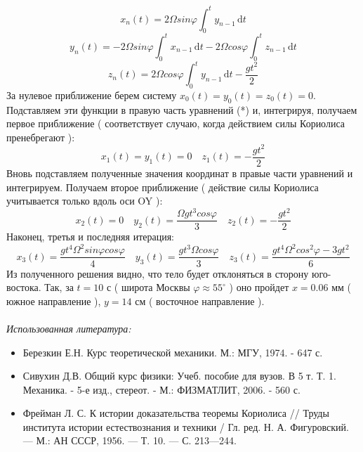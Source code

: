 \documentclass[a4paper, 12pt]{article}
\begin{document}
\[ x_{n}(t) = 2\Omega sin\varphi \int_0^t y_{n-1}\,\mathrm{d}t \]
\[ y_{n}(t) = -2\Omega sin\varphi \int_0^t x_{n-1}\,\mathrm{d}t -2\Omega cos\varphi \int_0^t z_{n-1}\,\mathrm{d}t \]
\[ z_{n}(t) = 2\Omega cos\varphi \int_0^t y_{n-1}\,\mathrm{d}t - \frac{g t^2}{2} \]
За нулевое приближение берем систему $x_0(t) = y_0(t) = z_0(t) = 0$. Подставляем эти функции в правую часть уравнений (*) и, интегрируя, получаем первое приближение ( соответствует случаю, когда действием силы Кориолиса пренебрегают ):
\[ x_1(t) = y_1(t) = 0 \quad z_1(t) = -\frac{gt^2}{2}\]
Вновь подставляем полученные значения координат в правые части уравнений и интегрируем. Получаем второе приближение ( действие силы Кориолиса учитывается только вдоль оси OY ):
\[ x_2(t) = 0 \quad y_2(t) = \frac{\Omega g t^3 cos\varphi}{3} \quad z_2(t) = -\frac{g t^2}{2}\]
Наконец, третья и последняя итерация:
\[ x_3(t)= \frac{gt^4 \Omega^2 sin\varphi cos\varphi}{4} \quad 
y_3(t) = \frac{gt^3 \Omega cos\varphi}{3} \quad
z_3(t)= \frac{gt^4 \Omega^2 cos^2\varphi - 3 gt^2 }{6}\]
Из полученного решения видно, что тело будет отклоняться в сторону юго-востока. Так, за $t = 10$ с ( широта Москвы $\varphi \approx 55^{\circ}$ ) оно пройдет $x = 0.06$ мм ( южное направление ), $y = 14$ см ( восточное направление ).

\paragraph{}
\emph{Использованная литература:}
\begin{itemize}
    \item Березкин Е.Н. Курс теоретической механики. М.: МГУ, 1974. - 647 с.
    \item Сивухин Д.В. Общий курс физики: Учеб. пособие для вузов. В 5 т. Т. 1. Механика. - 5-е изд., стереот. - М.: ФИЗМАТЛИТ, 2006. - 560 с.
    \item Фрейман Л. С. К истории доказательства теоремы Кориолиса // Труды института истории естествознания и техники / Гл. ред. Н. А. Фигуровский. — М.: АН СССР, 1956. — Т. 10. — С. 213—244.
\end{itemize}
\end{document}
